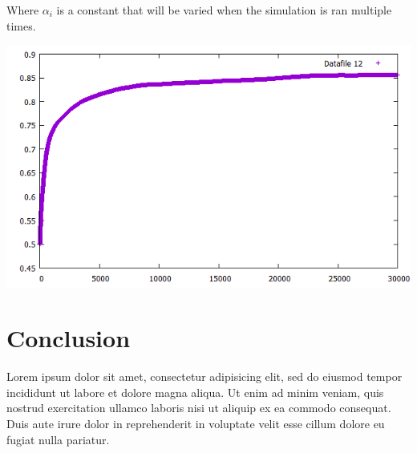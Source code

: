 \documentclass{article}
\begin{document}
Where $\alpha_i$ is a constant that will be varied when the simulation is ran multiple times.

\begin{center}
\includegraphics[width = \textwidth]{average}
\end{center}

\section{Conclusion}

Lorem ipsum dolor sit amet, consectetur adipisicing elit, sed do eiusmod tempor
incididunt ut labore et dolore magna aliqua. Ut enim ad minim veniam, quis
nostrud exercitation ullamco laboris nisi ut aliquip ex ea commodo consequat.
Duis aute irure dolor in reprehenderit in voluptate velit esse cillum dolore eu
fugiat nulla pariatur.
\end{document}
